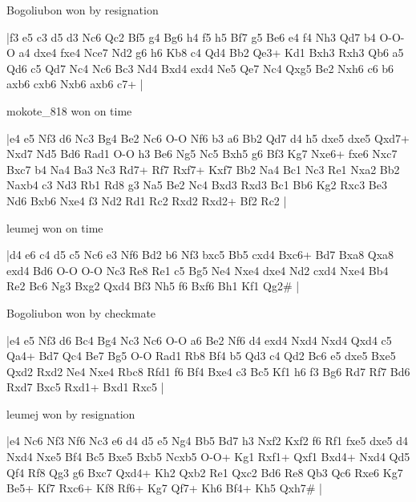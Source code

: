 \showboard

Bogoliubon won by resignation

\makegametitle
|f3 e5 c3 d5 d3 Nc6 Qc2 Bf5 g4 Bg6 h4 f5 h5 Bf7 g5 Be6 e4 f4 Nh3 Qd7 b4 O-O-O a4 dxe4 fxe4 Nce7 Nd2 g6 h6 Kb8 c4 Qd4 Bb2 Qe3+ Kd1 Bxh3 Rxh3 Qb6 a5 Qd6 c5 Qd7 Nc4 Nc6 Bc3 Nd4 Bxd4 exd4 Ne5 Qe7 Nc4 Qxg5 Be2 Nxh6 c6 b6 axb6 cxb6 Nxb6 axb6 c7+  |

\showboard

mokote\_818 won on time

\makegametitle
|e4 e5 Nf3 d6 Nc3 Bg4 Be2 Nc6 O-O Nf6 b3 a6 Bb2 Qd7 d4 h5 dxe5 dxe5 Qxd7+ Nxd7 Nd5 Bd6 Rad1 O-O h3 Be6 Ng5 Nc5 Bxh5 g6 Bf3 Kg7 Nxe6+ fxe6 Nxc7 Bxc7 b4 Na4 Ba3 Nc3 Rd7+ Rf7 Rxf7+ Kxf7 Bb2 Na4 Bc1 Nc3 Re1 Nxa2 Bb2 Naxb4 c3 Nd3 Rb1 Rd8 g3 Na5 Be2 Nc4 Bxd3 Rxd3 Bc1 Bb6 Kg2 Rxc3 Be3 Nd6 Bxb6 Nxe4 f3 Nd2 Rd1 Rc2 Rxd2 Rxd2+ Bf2 Rc2  |

\showboard

leumej won on time

\makegametitle
|d4 e6 c4 d5 c5 Nc6 e3 Nf6 Bd2 b6 Nf3 bxc5 Bb5 cxd4 Bxc6+ Bd7 Bxa8 Qxa8 exd4 Bd6 O-O O-O Nc3 Re8 Re1 c5 Bg5 Ne4 Nxe4 dxe4 Nd2 cxd4 Nxe4 Bb4 Re2 Bc6 Ng3 Bxg2 Qxd4 Bf3 Nh5 f6 Bxf6 Bh1 Kf1 Qg2\#  |

\showboard

Bogoliubon won by checkmate

\makegametitle
|e4 e5 Nf3 d6 Bc4 Bg4 Nc3 Nc6 O-O a6 Be2 Nf6 d4 exd4 Nxd4 Nxd4 Qxd4 c5 Qa4+ Bd7 Qc4 Be7 Bg5 O-O Rad1 Rb8 Bf4 b5 Qd3 c4 Qd2 Bc6 e5 dxe5 Bxe5 Qxd2 Rxd2 Ne4 Nxe4 Rbc8 Rfd1 f6 Bf4 Bxe4 c3 Bc5 Kf1 h6 f3 Bg6 Rd7 Rf7 Bd6 Rxd7 Bxc5 Rxd1+ Bxd1 Rxc5  |

\showboard

leumej won by resignation

\makegametitle
|e4 Nc6 Nf3 Nf6 Nc3 e6 d4 d5 e5 Ng4 Bb5 Bd7 h3 Nxf2 Kxf2 f6 Rf1 fxe5 dxe5 d4 Nxd4 Nxe5 Bf4 Bc5 Bxe5 Bxb5 Ncxb5 O-O+ Kg1 Rxf1+ Qxf1 Bxd4+ Nxd4 Qd5 Qf4 Rf8 Qg3 g6 Bxc7 Qxd4+ Kh2 Qxb2 Re1 Qxc2 Bd6 Re8 Qb3 Qc6 Rxe6 Kg7 Be5+ Kf7 Rxc6+ Kf8 Rf6+ Kg7 Qf7+ Kh6 Bf4+ Kh5 Qxh7\#  |

\showboard

